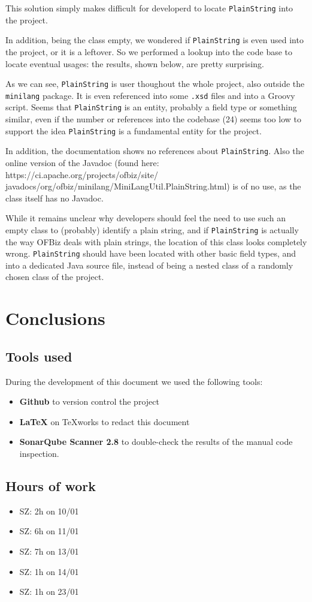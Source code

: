 \documentclass[11pt]{article} %
\begin{document}
This solution simply makes difficult for developerd to locate \texttt{PlainString} into the project. 

In addition, being the class empty, we wondered if \texttt{PlainString} is even used into the project, or it is a leftover. So we performed a lookup into the code base to locate eventual usages: the results, shown below, are pretty surprising.



As we can see, \texttt{PlainString} is user thoughout the whole project, also outside the \texttt{minilang} package. It is even referenced into some \texttt{.xsd} files and into a Groovy script. Seems that \texttt{PlainString} is an entity, probably a field type or something similar, even if the number or references into the codebase (24) seems too low to support the idea \texttt{PlainString} is a fundamental entity for the project.

In addition, the documentation shows no references about \texttt{PlainString}. Also the online version of the Javadoc (found here: https://ci.apache.org/projects/ofbiz/site/ javadocs/org/ofbiz/minilang/MiniLangUtil.PlainString.html) is of no use, as the class itself has no Javadoc.

While it remains unclear why developers should feel the need to use such an empty class to (probably) identify a plain string, and if \texttt{PlainString} is actually the way OFBiz deals with plain strings, the location of this class looks completely wrong.  \texttt{PlainString} should have been located with other basic field types, and into a dedicated Java source file, instead of being a nested class of a randomly chosen class of the project.


\section{Conclusions}

\subsection{Tools used}
During the development of this document we used the following tools:
\begin{itemize}
	\item \textbf{Github} to version control the project
	\item \textbf{\LaTeX} on TeXworks to redact this document
	\item \textbf{SonarQube Scanner 2.8} to double-check the results of the manual code inspection.
\end{itemize}

\subsection{Hours of work}
\begin{itemize}
	\item SZ: 2h on 10/01
	\item SZ: 6h on 11/01
	\item SZ: 7h on 13/01
	\item SZ: 1h on 14/01
	\item SZ: 1h on 23/01
\end{itemize}
\end{document}
